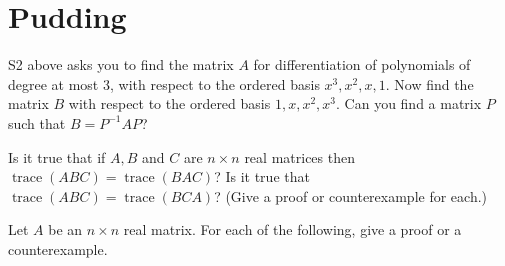 \documentclass[answers]{exam}
\begin{document}
\section*{Pudding}
\begin{questions}

\question%
S2 above asks you to find the matrix $A$ for differentiation of polynomials of degree at most 3, with respect to the ordered basis $x^{3}, x^{2}, x, 1$. Now find the matrix $B$ with respect to the ordered basis $1, x, x^{2}, x^{3}$. Can you find a matrix $P$ such that $B=P^{-1} A P$?



\question%
Is it true that if $A, B$ and $C$ are $n \times n$ real matrices then $\operatorname{trace}(A B C)=\operatorname{trace}(B A C)$? Is it true that $\operatorname{trace}(A B C)=\operatorname{trace}(B C A)$? (Give a proof or counterexample for each.)



\question%
Let $A$ be an $n \times n$ real matrix. For each of the following, give a proof or a counterexample.

\end{questions}
\end{document}
